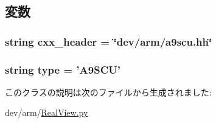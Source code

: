 \subsection{変数}
\hypertarget{classRealView_1_1A9SCU_a17da7064bc5c518791f0c891eff05fda}{
\subsubsection[{cxx\_\-header}]{\setlength{\rightskip}{0pt plus 5cm}string {\bf cxx\_\-header} = \char`\"{}dev/arm/a9scu.hh\char`\"{}}}
\label{classRealView_1_1A9SCU_a17da7064bc5c518791f0c891eff05fda}
\hypertarget{classRealView_1_1A9SCU_acce15679d830831b0bbe8ebc2a60b2ca}{
\subsubsection[{type}]{\setlength{\rightskip}{0pt plus 5cm}string {\bf type} = '{\bf A9SCU}'}}
\label{classRealView_1_1A9SCU_acce15679d830831b0bbe8ebc2a60b2ca}


このクラスの説明は次のファイルから生成されました:\begin{DoxyCompactItemize}
\item 
dev/arm/\hyperlink{RealView_8py}{RealView.py}\end{DoxyCompactItemize}
